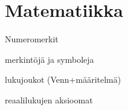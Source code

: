 \part*{Matematiikka}
Numeromerkit


merkintöjä ja symboleja


lukujoukot (Venn+määritelmä)

reaalilukujen aksioomat


